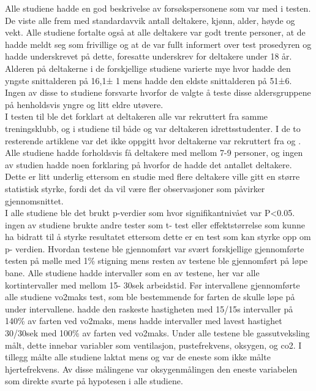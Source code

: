 \documentclass[
]{book}
\begin{document}
Alle studiene hadde en god beskrivelse av forsøkspersonene som var med i testen. De viste alle frem med standardavvik antall deltakere, kjønn, alder, høyde og vekt. Alle studiene fortalte også at alle deltakere var godt trente personer, at de hadde meldt seg som frivillige og at de var fullt informert over test prosedyren og hadde underskrevet på dette, foresatte underskrev for deltakere under 18 år. Alderen på deltakerne i de forskjellige studiene varierte mye hvor \citet{thevenet2007a} hadde den yngste snittalderen på 16,1± 1 mens \citet{billat2001} hadde den eldste snittalderen på 51±6. Ingen av disse to studiene forsvarte hvorfor de valgte å teste disse aldersgruppene på henholdsvis yngre og litt eldre utøvere.\\
I testen til \citet{thevenet2007} ble det forklart at deltakeren alle var rekruttert fra samme treningsklubb, og i studiene til både \citet{dupont2002} og \citet{wakefield2009} var deltakeren idrettsstudenter. I de to resterende artiklene var det ikke oppgitt hvor deltakerne var rekruttert fra \citet{billat2001} og \citet{billat2000} . Alle studiene hadde forholdsvis få deltakere med mellom 7-9 personer, og ingen av studien hadde noen forklaring på hvorfor de hadde det antallet deltakere. Dette er litt underlig ettersom en studie med flere deltakere ville gitt en større statistisk styrke, fordi det da vil være fler observasjoner som påvirker gjennomsnittet.\\
I alle studiene ble det brukt p-verdier som hvor signifikantnivået var P\textless0.05. ingen av studiene brukte andre tester som t- test eller effektstørrelse som kunne ha bidratt til å styrke resultatet ettersom dette er en test som kan styrke opp om p- verdien. Hvordan testene ble gjennomført var svært forskjellige \citet{wakefield2009} gjennomførte testen på mølle med 1\% stigning mens resten av testene ble gjennomført på løpe bane. Alle studiene hadde intervaller som en av testene, her var alle kortintervaller med mellom 15- 30sek arbeidstid. Før intervallene gjennomførte alle studiene vo2maks test, som ble bestemmende for farten de skulle løpe på under intervallene. \citet{dupont2002} hadde den raskeste hastigheten med 15/15s intervaller på 140\% av farten ved vo2maks, mens \citet{thevenet2007} hadde intervaller med lavest hastighet 30/30sek med 100\% av farten ved vo2maks. Under alle testene ble gassutveksling målt, dette innebar variabler som ventilasjon, pustefrekvens, oksygen, og co2. I tillegg målte alle studiene laktat mens \citet{billat2001} og \citet{billat2000} var de eneste som ikke målte hjertefrekvens. Av disse målingene var oksygenmålingen den eneste variabelen som direkte svarte på hypotesen i alle studiene.
\end{document}
